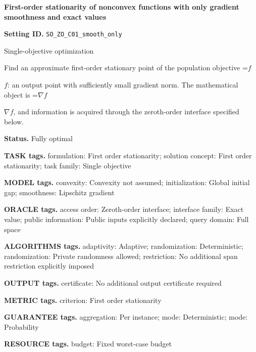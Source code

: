 \documentclass[10pt,a4paper]{article}
\newcommand{\AtlasMath}[1]{\par\begingroup\centering\setbox0=\hbox{$\displaystyle #1$}\ifdim\wd0>1.4\linewidth\typeout{ATLAS WIDE FORMULA: \the\wd0}\fi\ifdim\wd0>\linewidth\resizebox{\linewidth}{!}{\box0}\else\box0\fi\par\endgroup}
\newcommand{\AtlasInlineMath}[1]{\begingroup\setbox0=\hbox{$#1$}\ifdim\wd0>.4\linewidth\endgroup\AtlasMath{#1}\else\endgroup$#1$\fi}
\begin{document}
\raggedright

{\LARGE\bfseries\sffamily\color{AtlasNavy} First-order stationarity of nonconvex functions with only gradient smoothness and exact values\par}\vspace{5pt}


\textbf{Setting ID.} \texttt{SO\_\allowbreak{}ZO\_\allowbreak{}C01\_\allowbreak{}smooth\_\allowbreak{}only}



Single-objective optimization



Find an approximate first-order stationary point of the population objective \AtlasInlineMath{f}: an output point with sufficiently small gradient norm. The mathematical object is \AtlasInlineMath{\nabla f}, and information is acquired through the zeroth-order interface specified below.



\textbf{Status.} Fully optimal



\textbf{TASK tags.} formulation: First order stationarity; solution concept: First order stationarity; task family: Single objective



\textbf{MODEL tags.} convexity: Convexity not assumed; initialization: Global initial gap; smoothness: Lipschitz gradient



\textbf{ORACLE tags.} access order: Zeroth-order interface; interface family: Exact value; public information: Public inputs explicitly declared; query domain: Full space



\textbf{ALGORITHMS tags.} adaptivity: Adaptive; randomization: Deterministic; randomization: Private randomness allowed; restriction: No additional span restriction explicitly imposed



\textbf{OUTPUT tags.} certificate: No additional output certificate required



\textbf{METRIC tags.} criterion: First order stationarity



\textbf{GUARANTEE tags.} aggregation: Per instance; mode: Deterministic; mode: Probability



\textbf{RESOURCE tags.} budget: Fixed worst-case budget
\end{document}
